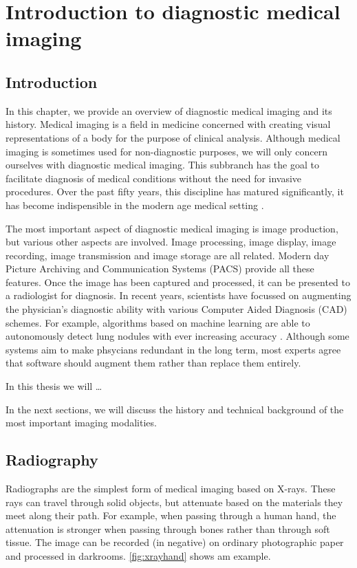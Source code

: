 \chapter{Introduction to diagnostic medical imaging}

\section{Introduction}
In this chapter, we provide an overview of diagnostic medical imaging and its
history. Medical imaging is a field in medicine concerned with creating visual
representations of a body for the purpose of clinical analysis. Although medical
imaging is sometimes used for non-diagnostic purposes, we will only concern
ourselves with diagnostic medical imaging. This subbranch has the goal to
facilitate diagnosis of medical conditions without the need for invasive
procedures. Over the past fifty years, this discipline has matured
significantly, it has become indispensible in the modern age medical setting
\cite{review}.

The most important aspect of diagnostic medical imaging is image production, but
various other aspects are involved. Image processing, image display, image
recording, image transmission and image storage are all related. Modern day
Picture Archiving and Communication Systems (PACS) provide all these features.
Once the image has been captured and processed, it can be presented to a
radiologist for diagnosis. In recent years, scientists have focussed on
augmenting the physician's diagnostic ability with various Computer Aided
Diagnosis (CAD) schemes. For example, algorithms based on machine learning are
able to autonomously detect lung nodules with ever increasing accuracy
\cite{ginneken}. Although some systems aim to make phsycians redundant in the
long term, most experts agree that software should augment them rather than
replace them entirely.

In this thesis we will \ldots %

In the next sections, we will discuss the history and technical background of
the most important imaging modalities.

\section{Radiography}
Radiographs are the simplest form of medical imaging based on X-rays. These rays
can travel through solid objects, but attenuate based on the materials they meet
along their path. For example, when passing through a human hand, the
attenuation is stronger when passing through bones rather than through soft
tissue. The image can be recorded (in negative) on ordinary photographic paper
and processed in darkrooms. \autoref{fig:xrayhand} shows am example.

